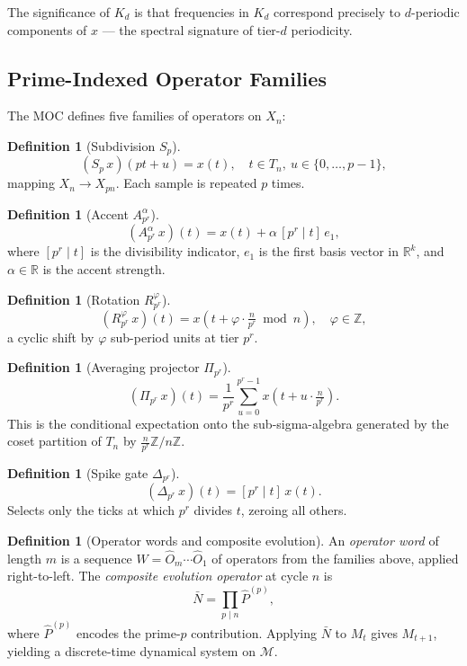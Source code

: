 \documentclass[11pt,a4paper]{article}
\theoremstyle{plain}
\theoremstyle{definition}
\newtheorem{definition}[theorem]{Definition}
\theoremstyle{remark}
\newcommand{\multsp}{\mathcal{M}}
\begin{document}
The significance of $K_d$ is that frequencies in $K_d$ correspond precisely to
$d$-periodic components of $x$ --- the spectral signature of tier-$d$ periodicity.

\subsection{Prime-Indexed Operator Families}

The MOC defines five families of operators on $X_n$:

\begin{definition}[Subdivision $S_p$]
  \[
    (S_p\, x)(pt + u) = x(t), \quad t \in T_n,\ u \in \{0,\ldots,p-1\},
  \]
  mapping $X_n \to X_{pn}$. Each sample is repeated $p$ times.
\end{definition}

\begin{definition}[Accent $A_{p^r}^\alpha$]
  \[
    (A_{p^r}^\alpha\, x)(t) = x(t) + \alpha\, [p^r \mid t]\, e_1,
  \]
  where $[p^r \mid t]$ is the divisibility indicator, $e_1$ is the first basis vector
  in $\mathbb{R}^k$, and $\alpha \in \mathbb{R}$ is the accent strength.
\end{definition}

\begin{definition}[Rotation $R_{p^r}^\varphi$]
  \[
    (R_{p^r}^\varphi\, x)(t) = x\!\left(t + \varphi \cdot \tfrac{n}{p^r} \bmod n\right),
    \quad \varphi \in \mathbb{Z},
  \]
  a cyclic shift by $\varphi$ sub-period units at tier $p^r$.
\end{definition}

\begin{definition}[Averaging projector $\Pi_{p^r}$]
  \[
    (\Pi_{p^r}\, x)(t) = \frac{1}{p^r} \sum_{u=0}^{p^r - 1} x\!\left(t + u \cdot \tfrac{n}{p^r}\right).
  \]
  This is the conditional expectation onto the sub-sigma-algebra generated by the
  coset partition of $T_n$ by $\frac{n}{p^r}\mathbb{Z}/n\mathbb{Z}$.
\end{definition}

\begin{definition}[Spike gate $\Delta_{p^r}$]
  \[
    (\Delta_{p^r}\, x)(t) = [p^r \mid t]\, x(t).
  \]
  Selects only the ticks at which $p^r$ divides $t$, zeroing all others.
\end{definition}

\begin{definition}[Operator words and composite evolution]
  An \emph{operator word} of length $m$ is a sequence $W = \hat{O}_m \cdots \hat{O}_1$
  of operators from the families above, applied right-to-left. The
  \emph{composite evolution operator} at cycle $n$ is
  \[
    \bar{N} = \prod_{p \mid n} \hat{P}^{(p)},
  \]
  where $\hat{P}^{(p)}$ encodes the prime-$p$ contribution. Applying $\bar{N}$ to
  $M_t$ gives $M_{t+1}$, yielding a discrete-time dynamical system on $\multsp$.
\end{definition}
\end{document}
